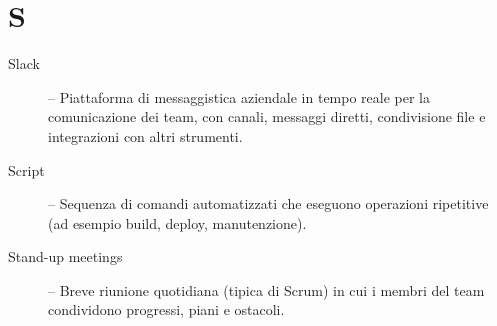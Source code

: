 \section*{S}
\begin{description}
    \item[Slack] -- Piattaforma di messaggistica aziendale in tempo reale per la comunicazione dei team, con canali, messaggi diretti, condivisione file e integrazioni con altri strumenti.
    \item[Script] -- Sequenza di comandi automatizzati che eseguono operazioni ripetitive (ad esempio build, deploy, manutenzione).
    \item[Stand-up meetings] -- Breve riunione quotidiana (tipica di Scrum) in cui i membri del team condividono progressi, piani e ostacoli.
\end{description}

